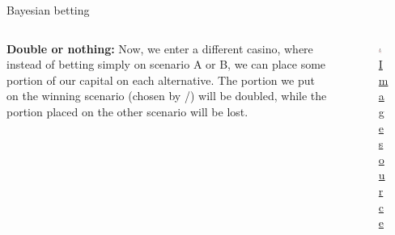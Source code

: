 \documentclass{beamer}
\theoremstyle{definition}
\begin{document}
\begin{frame}{Bayesian betting}



\begin{columns}

\begin{column}{0.7\textwidth}
            
{\bf Double or nothing:}
Now, we enter a different casino, where instead of betting simply on scenario A or B, we can place some portion of our capital on each alternative. The portion we put on the winning scenario (chosen by \PII/) will be doubled, while the portion placed on the other scenario will be lost.

        \end{column}

\begin{column}{0.3\textwidth}
    \begin{figure}
    \centering
        \includegraphics[width=0.8\textwidth]{img/Chips.png}
        \caption{\small \centering \href{https://www.freepik.com/premium-vector/casino-chips-falling-realistic-3d-gambling-poker-chips-background-poster-card-logo_19282474.htm}{Image source}}
    \end{figure}
\end{column}
        

\end{columns}

\end{frame}
\end{document}
